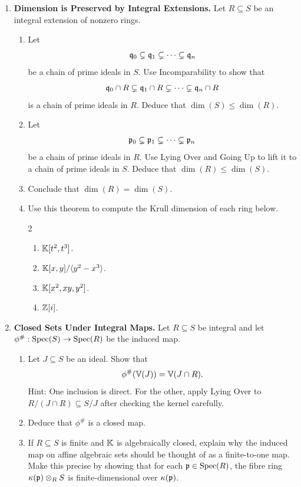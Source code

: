 \documentclass[12pt,reqno]{amsart}
\begin{document}
\begin{enumerate}[leftmargin=*, resume=problems]
\item \textbf{Dimension is Preserved by Integral Extensions.} Let $R\subseteq S$ be an integral extension of nonzero rings.
\begin{enumerate}
    \item Let
    \[
    \mathfrak{q}_0\subsetneq \mathfrak{q}_1\subsetneq\cdots\subsetneq \mathfrak{q}_n
    \]
    be a chain of prime ideals in $S$. Use Incomparability to show that
    \[
    \mathfrak{q}_0\cap R\subsetneq \mathfrak{q}_1\cap R\subsetneq\cdots\subsetneq \mathfrak{q}_n\cap R
    \]
    is a chain of prime ideals in $R$. Deduce that $\dim(S)\leq \dim(R)$.
    \item Let
    \[
    \mathfrak{p}_0\subsetneq \mathfrak{p}_1\subsetneq\cdots\subsetneq \mathfrak{p}_n
    \]
    be a chain of prime ideals in $R$. Use Lying Over and Going Up to lift it to a chain of prime ideals in $S$. Deduce that $\dim(R)\leq \dim(S)$.
    \item Conclude that $\dim(R)=\dim(S)$.
    \item Use this theorem to compute the Krull dimension of each ring below.
    \begin{multicols}{2}
    \begin{enumerate}
        \item $\mathbb{K}[t^2,t^3]$.
        \item $\mathbb{K}[x,y]/\langle y^2-x^3\rangle$.
        \item $\mathbb{K}[x^2,xy,y^2]$.
        \item $\mathbb{Z}[i]$.
    \end{enumerate}
    \end{multicols}
\end{enumerate}

\item \textbf{Closed Sets Under Integral Maps.} Let $R\subseteq S$ be integral and let $\phi^{\#}:\operatorname{Spec}(S)\to\operatorname{Spec}(R)$ be the induced map.
\begin{enumerate}
    \item Let $J\subseteq S$ be an ideal. Show that
    \[
    \phi^{\#}(\mathbb{V}(J))=\mathbb{V}(J\cap R).
    \]
    Hint: One inclusion is direct. For the other, apply Lying Over to $R/(J\cap R)\subseteq S/J$ after checking the kernel carefully.
    \item Deduce that $\phi^{\#}$ is a closed map.
    \item If $R\subseteq S$ is finite and $\mathbb{K}$ is algebraically closed, explain why the induced map on affine algebraic sets should be thought of as a finite-to-one map. Make this precise by showing that for each $\mathfrak{p}\in\operatorname{Spec}(R)$, the fibre ring $\kappa(\mathfrak{p})\otimes_R S$ is finite-dimensional over $\kappa(\mathfrak{p})$.
\end{enumerate}

\end{enumerate}
\end{document}
